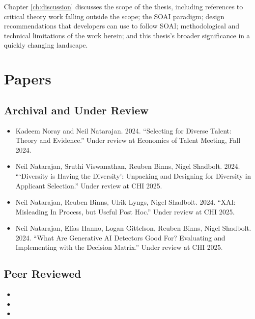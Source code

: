 Chapter \ref{ch:discussion} discusses the scope of the thesis, including references to critical theory work falling outside the scope; the SOAI paradigm; design recommendations that developers can use to follow SOAI; methodological and technical limitations of the work herein; and this thesis's broader significance in a quickly changing landscape. 

\section{Papers}
\subsection{Archival and Under Review}
\begin{itemize}
    \item Kadeem Noray and Neil Natarajan. 2024. “Selecting for Diverse Talent: Theory and Evidence.” Under review at Economics of Talent Meeting, Fall 2024.
    \item Neil Natarajan, Sruthi Viswanathan, Reuben Binns, Nigel Shadbolt. 2024. “‘Diversity is Having the Diversity’: Unpacking and Designing for Diversity in Applicant Selection.” Under review at CHI 2025.
    \item Neil Natarajan, Reuben Binns, Ulrik Lyngs, Nigel Shadbolt. 2024. “XAI: Misleading In Process, but Useful Post Hoc.” Under review at CHI 2025.
    \item Neil Natarajan, Elías Hanno, Logan Gittelson, Reuben Binns, Nigel Shadbolt. 2024. “What Are Generative AI Detectors Good For? Evaluating and Implementing with the Decision Matrix.” Under review at CHI 2025.
\end{itemize}

\subsection{Peer Reviewed}
\begin{itemize}
    \item {}
    \item {} 
    \item {}
\end{itemize}



